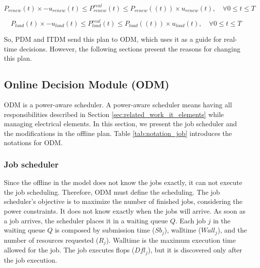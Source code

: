 \begin{equation}
    P_{renew}(t) \times -u_{renew}(t) \le P^{real}_{renew}(t) \le P_{renew}((t)) \times u_{renew}(t), \quad \forall 0 \le t \le T
    \label{equ:uncertainty_power}
\end{equation}

\begin{equation}
    P_{load}(t) \times -u_{load}(t) \le P^{real}_{load}(t) \le P_{load}((t)) \times u_{load}(t), \quad \forall 0 \le t \le T
    \label{equ:uncertainty_load}
\end{equation}

So, PDM and ITDM send this plan to ODM, which uses it as a guide for real-time decisions. However, the following sections present the reasons for changing this plan.

\subsection{Online Decision Module (ODM)}
\label{sec:ODM}

ODM is a power-aware scheduler. A power-aware scheduler means having all responsibilities described in Section \ref{sec:related_work_it_elements} while managing electrical elements. In this section, we present the job scheduler and the modifications in the offline plan. Table \ref{tab:notation_job} introduces the notations for ODM.



\subsubsection{Job scheduler}

Since the offline in the model does not know the jobs exactly, it can not execute the job scheduling. Therefore, ODM must define the scheduling. The job scheduler's objective is to maximize the number of finished jobs, considering the power constraints. It does not know exactly when the jobs will arrive. As soon as a job arrives, the scheduler places it in a waiting queue $Q$. Each job $j$ in the waiting queue $Q$ is composed by submission time ($Sb_j$), walltime ($Wall_j$), and the number of resources requested ($R_j$). Walltime is the maximum execution time allowed for the job. The job executes flops ($Dfl_j$), but it is discovered only after the job execution.

